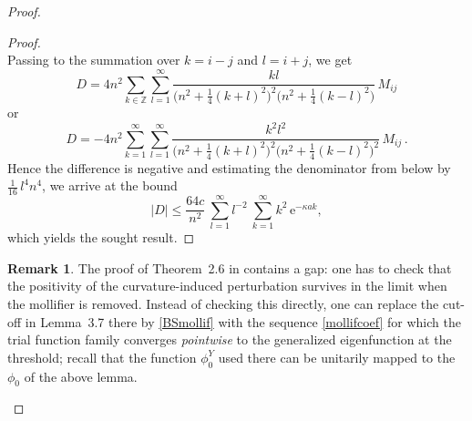 \documentclass{article}
\numberwithin{equation}{section}
\theoremstyle{definition}
\newtheorem{remark}[theorem]{Remark}
\newcommand{\e}{\mathrm{e}}
\newcommand{\Z}{\mathbb{Z}}
\begin{document}
\begin{proof}
\begin{proof}
\begin{equation*}
\end{equation*}
Passing to the summation over $k=i-j$ and $l=i+j$, we get
 \begin{equation*}
D = 4n^2 \sum_{k\in\Z} \sum_{l=1}^\infty \frac{kl}{\big(n^2+\frac14(k+l)^2\big)^2 \big(n^2+\frac14(k-l)^2\big)}\,M_{ij}
\end{equation*}
or
\begin{equation*}
D = -4n^2 \sum_{k=1}^\infty \sum_{l=1}^\infty \frac{k^2l^2}{\big(n^2+\frac14(k+l)^2\big)^2 \big(n^2+\frac14(k-l)^2\big)^2}\,M_{ij}\,.
\end{equation*}
Hence the difference is negative and estimating the denominator from below by $\frac{1}{16}\,l^4n^4$, we arrive at the bound
\begin{equation*}
|D| \le \frac{64c}{n^2} \: \sum_{l=1}^\infty l^{-2} \: \sum_{k=1}^\infty k^2\,\e^{-\kappa ak},
\end{equation*}
which yields the sought result.
\end{proof}

\begin{remark}
The proof of Theorem~2.6 in \cite{Ex24} contains a gap: one has to check that the positivity of the curvature-induced perturbation survives in the limit when the mollifier is removed. Instead of checking this directly, one can replace the cut-off in Lemma~3.7 there by \eqref{BSmollif} with the sequence \eqref{mollifcoef} for which the trial function family converges \emph{pointwise} to the generalized eigenfunction at the threshold; recall that the function $\phi_0^Y$ used there can be unitarily mapped to the $\phi_0$ of the above lemma.
\end{remark}


\end{proof}
\end{document}
